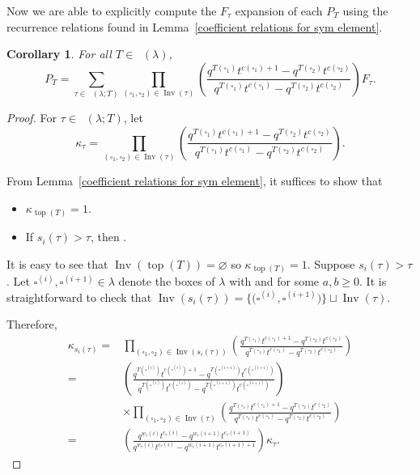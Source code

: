 \documentclass[pdftex]{sigma}
\numberwithin{equation}{section}
\newtheorem{Corollary}[Theorem]{Corollary}
\theoremstyle{definition}
\DeclareMathOperator{\PSYT}{\mathrm{PSYT}_{\geq 0}}
\DeclareMathOperator{\RSSYT}{\mathrm{RSSYT}_{\geq 0}}
\DeclareMathOperator{\Inv}{\mathrm{Inv}}
\DeclareMathOperator{\Top}{\mathrm{top}}
\begin{document}
Now we are able to explicitly compute the $F_{\tau}$ expansion of each $P_{T}$ using the recurrence relations found in Lemma~\ref{coefficient relations for sym element}.

\begin{Corollary}\label{expansion of sym into nonsym}
 For all $T\in \RSSYT(\lambda)$,
 \[
 P_T = \sum_{\tau \in \PSYT(\lambda;T)} \prod_{(\square_1,\square_2) \in \Inv(\tau)} \left( \frac{q^{T(\square_1)}t^{c(\square_1) +1} - q^{T(\square_2)}t^{c(\square_2) }}{q^{T(\square_1)}t^{c(\square_1)} - q^{T(\square_2)}t^{c(\square_2)}} \right) F_{\tau}.
 \]

\end{Corollary}
\begin{proof}
 For $\tau \in \PSYT(\lambda;T)$, let
 \[
 \kappa_{\tau}= \prod_{(\square_1,\square_2) \in \Inv(\tau)} \left( \frac{q^{T(\square_1)}t^{c(\square_1) +1} - q^{T(\square_2)}t^{c(\square_2) }}{q^{T(\square_1)}t^{c(\square_1)} - q^{T(\square_2)}t^{c(\square_2)}} \right).
 \]

 {\samepage From Lemma~\ref{coefficient relations for sym element}, it suffices to show that
 \begin{itemize}
\itemsep=0pt
 \item $\kappa_{\Top(T)} = 1$.
 \item If $s_i(\tau) > \tau$, then .
 \end{itemize}}

 It is easy to see that $\Inv(\Top(T)) = \varnothing$ so $\kappa_{\Top(T)} = 1$. Suppose $s_i(\tau) > \tau$. Let $\square^{(i)},\square^{(i+1)} \in \lambda$ denote the boxes of $\lambda$ with  and  for some $a,b \geq 0$. It is straightforward to check that
$
 \Inv(s_i(\tau)) = \big\{\bigl(\square^{(i)},\square^{(i+1)}\bigr)\big\} \sqcup \Inv(\tau)$.


 Therefore,
 \begin{align*}
 \kappa_{s_i(\tau)} ={}& \prod_{(\square_1,\square_2) \in \Inv(s_i(\tau))} \left( \frac{q^{T(\square_1)}t^{c(\square_1) +1} - q^{T(\square_2)}t^{c(\square_2) }}{q^{T(\square_1)}t^{c(\square_1)} - q^{T(\square_2)}t^{c(\square_2)}} \right) \\
 = {}&\left( \frac{q^{T(\square^{(i)})}t^{c(\square^{(i)}) +1} - q^{T(\square^{(i+1)})}t^{c(\square^{(i+1)}) }}{q^{T(\square^{(i)})}t^{c(\square^{(i)})} - q^{T(\square^{(i+1)})}t^{c(\square^{(i+1)})}} \right) \\
 &\times\prod_{(\square_1,\square_2) \in \Inv(\tau)} \left( \frac{q^{T(\square_1)}t^{c(\square_1) +1} - q^{T(\square_2)}t^{c(\square_2) }}{q^{T(\square_1)}t^{c(\square_1)} - q^{T(\square_2)}t^{c(\square_2)}} \right) \\
 ={}& \left( \frac{q^{w_{\tau}(i)}t^{c_{\tau}(i)} - q^{w_{\tau}(i+1)}t^{c_{\tau}(i+1)}}{q^{w_{\tau}(i)}t^{c_{\tau}(i)} - q^{w_{\tau}(i+1)}t^{c_{\tau}(i+1)+1}} \right) \kappa_{\tau}.\tag*{\qed}
 \end{align*}\renewcommand{\qed}{}
\end{proof}
\end{document}
